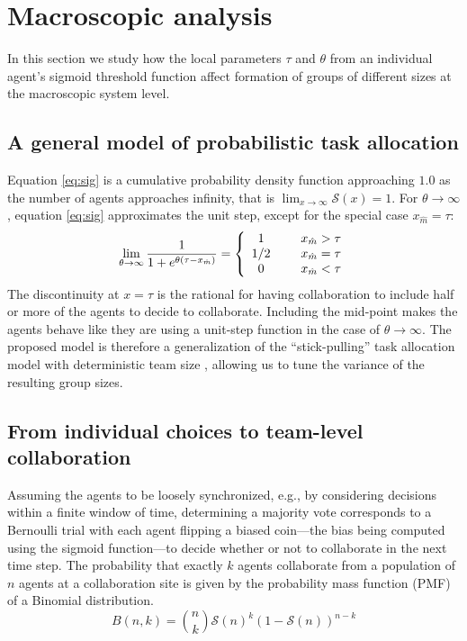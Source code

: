 \documentclass{TeXstyles/DARS/svmult}  %
\newcommand{\sig}{\mathcal{S}}
\newcommand{\xm}{x_{\hat{m}}}
\begin{document}
\section{Macroscopic analysis}\label{sec:macromodel}
In this section we study how the local parameters $\tau$ and $\theta$ from an individual agent's sigmoid threshold function affect formation of groups of different sizes at the macroscopic system level.

\subsection{A general model of probabilistic task allocation}
Equation \eqref{eq:sig} is a cumulative probability density function approaching $1.0$ as the number of agents approaches infinity, that is $\lim_{x \to \infty}\sig(x)=1$. For $\theta \to \infty$, equation \eqref{eq:sig} approximates the unit step, except for the special case $\xm=\tau$:
\begin{equation}
\lim_{\theta \to \infty} \frac{1}{1+e^{\theta(\tau-\xm)}}=
\left\{
\begin{array}{cc}
 1 & \hspace{.5cm} \xm>\tau \\
 1/2 & \hspace{.5cm} \xm=\tau	\\
 0 & \hspace{.5cm} \xm<\tau
\end{array}
\right.
\end{equation}
The discontinuity at $x=\tau$ is the rational for having collaboration to include half or more of the agents to decide to collaborate. Including the mid-point makes the agents behave like they are using a unit-step function in the case of $\theta \to \infty$. The proposed model is therefore a generalization of the ``stick-pulling'' task allocation model with deterministic team size \cite{Lerman2001}, allowing us to tune the variance of the resulting group sizes. 

\subsection{From individual choices to team-level collaboration}
Assuming the agents to be loosely synchronized, e.g., by considering decisions within a finite window of time, determining a majority vote corresponds to a Bernoulli trial with each agent flipping a biased coin---the bias being computed using the sigmoid function---to decide whether or not to collaborate in the next time step. The probability that exactly $k$ agents collaborate from a population of $n$ agents at a collaboration site is given by the probability mass function (PMF) of a Binomial distribution.
\begin{equation}
	B(n, k) = \binom{n}{k}\sig(n)^{k}\left(1 - \sig(n)\right)^{n - k}\label{eq:binomial}
\end{equation}
\end{document}
